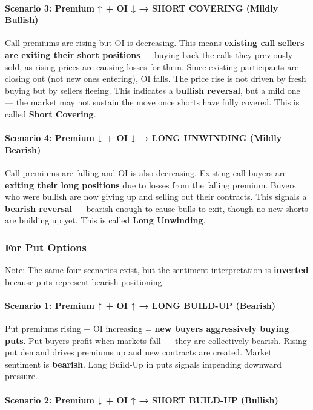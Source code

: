 \documentclass[12pt,openany]{book}
\begin{document}
\paragraph{Scenario 3: Premium ↑ + OI ↓ → SHORT COVERING (Mildly Bullish)}

Call premiums are rising but OI is decreasing. This means \textbf{existing call sellers are exiting their short positions} — buying back the calls they previously sold, as rising prices are causing losses for them. Since existing participants are closing out (not new ones entering), OI falls. The price rise is not driven by fresh buying but by sellers fleeing. This indicates a \textbf{bullish reversal}, but a mild one — the market may not sustain the move once shorts have fully covered. This is called \textbf{Short Covering}.

\paragraph{Scenario 4: Premium ↓ + OI ↓ → LONG UNWINDING (Mildly Bearish)}

Call premiums are falling and OI is also decreasing. Existing call buyers are \textbf{exiting their long positions} due to losses from the falling premium. Buyers who were bullish are now giving up and selling out their contracts. This signals a \textbf{bearish reversal} — bearish enough to cause bulls to exit, though no new shorts are building up yet. This is called \textbf{Long Unwinding}.

\subsubsection{For Put Options}

Note: The same four scenarios exist, but the sentiment interpretation is \textbf{inverted} because puts represent bearish positioning.

\paragraph{Scenario 1: Premium ↑ + OI ↑ → LONG BUILD-UP (Bearish)}

Put premiums rising + OI increasing = \textbf{new buyers aggressively buying puts}. Put buyers profit when markets fall — they are collectively bearish. Rising put demand drives premiums up and new contracts are created. Market sentiment is \textbf{bearish}. Long Build-Up in puts signals impending downward pressure.

\paragraph{Scenario 2: Premium ↓ + OI ↑ → SHORT BUILD-UP (Bullish)}
\end{document}
